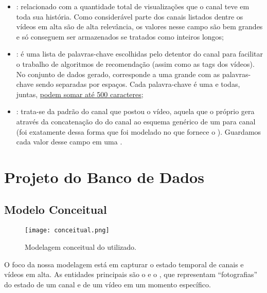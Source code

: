 \begin{itemize}
    \item {}: relacionado com a quantidade total de visualizações que o canal teve em toda sua história. Como considerável parte dos canais listados dentre os vídeos em alta são de alta relevância, os valores nesse campo são bem grandes e só conseguem ser armazenados se tratados como inteiros longos;
    \item {}: é uma lista de palavras-chave escolhidas pelo detentor do canal para facilitar o trabalho de algoritmos de recomendação (assim como as tags dos vídeos). No conjunto de dados gerado, corresponde a uma grande  com as palavras-chave sendo separadas por espaços. Cada palavra-chave é uma  e todas, juntas, \href{https://developers.google.com/youtube/v3/docs/channels?hl=pt-br#brandingSettings.channel.keywords}{podem somar até 500 caracteres}\cite{google_youtube_channels};
    \item {}: trata-se da  padrão do canal que postou o vídeo, aquela que o próprio  gera através da concatenação do  do canal ao esquema genérico de um  para canal (foi exatamente dessa forma que foi modelado no  que fornece o ). Guardamos cada valor desse campo em uma .




  \end{itemize}

\chapter{Projeto do Banco de Dados}

\section{Modelo Conceitual}

  \vspace{2cm}
  \begin{figure}[H]
    \centering
    \texttt{[image: conceitual.png]}
    \caption{Modelagem conceitual do  utilizado.}
  \end{figure}

  O foco da nossa modelagem está em capturar o estado temporal de canais e vídeos em alta. As entidades principais são o  e o , que representam ``fotografias'' do estado de um canal e de um vídeo em um momento específico.

